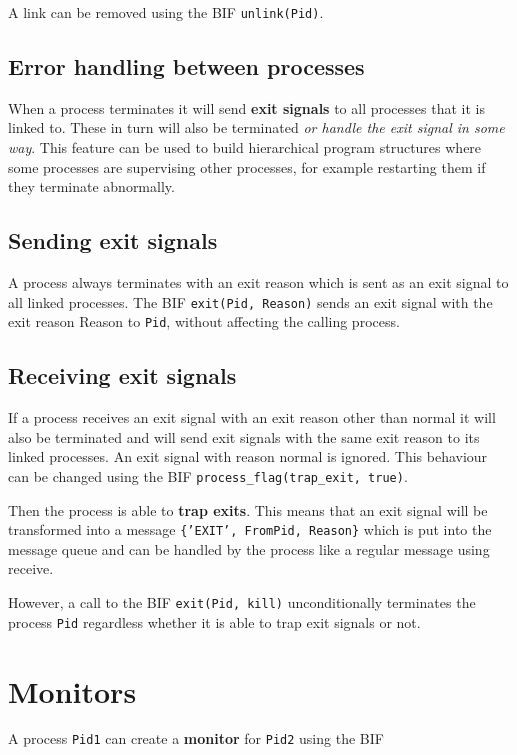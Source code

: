A link can be removed using the BIF \texttt{unlink(Pid)}.


\subsection{Error handling between processes}
When a process terminates it will send \textbf{exit signals} to all
processes that it is linked to. These in turn will also be terminated
\textit{or handle the exit signal in some way}. This feature can be
used to build hierarchical program structures where some processes are
supervising other processes, for example restarting them if they
terminate abnormally.


\subsection{Sending exit signals}
\label{processes:sendexitsignals}
A process always terminates with an exit reason which is sent as an
exit signal to all linked processes. The BIF \texttt{exit(Pid,
  Reason)} sends an exit signal with the exit reason Reason to
\texttt{Pid}, without affecting the calling process.


\subsection{Receiving exit signals}
\label{processes:recvexitsignals}
If a process receives an exit signal with an exit reason other than
normal it will also be terminated and will send exit signals with the
same exit reason to its linked processes. An exit signal with reason
normal is ignored. This behaviour can be changed using the BIF
\texttt{process\_flag(trap\_exit, true)}.

Then the process is able to \textbf{trap exits}. This means that an
exit signal will be transformed into a message \texttt{\{'EXIT',
  FromPid, Reason\}} which is put into the message queue and can be
handled by the process like a regular message using receive.

However, a call to the BIF \texttt{exit(Pid, kill)} unconditionally
terminates the process \texttt{Pid} regardless whether it is able to
trap exit signals or not.


\section{Monitors}
A process \texttt{Pid1} can create a \textbf{monitor} for
\texttt{Pid2} using the BIF

